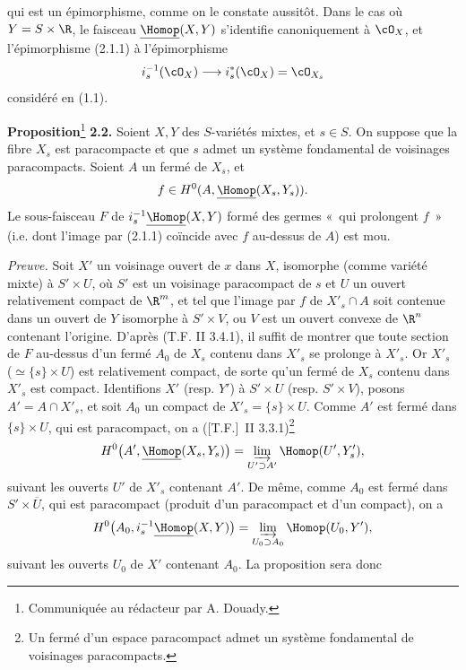 qui est un
épimorphisme, comme on le constate aussitôt. Dans le cas où $Y=S\times\R$, le faisceau $\underline{\Homop}(X,Y)$ s'identifie canoniquement à $\cO_X$, et l'épimorphisme (2.1.1) à l'épimorphisme
\[
  i_s^{-1}(\cO_X)\longrightarrow i_s^*(\cO_X)=\cO_{X_s}
\]
considéré en (1.1).

\textbf{Proposition}\footnote{Communiquée au rédacteur par A. Douady.} \textbf{2.2.} Soient $X,Y$ des $S$-variétés mixtes, et $s\in S$. On suppose que la fibre $X_s$ est paracompacte et que $s$ admet un système fondamental de voisinages paracompacts. Soient $A$ un fermé de $X_s$, et
\[
  f\in H^0(A,\underline{\Homop}(X_s,Y_s)).
\]
Le sous-faisceau $F$ de $i_s^{-1}\underline{\Homop}(X,Y)$ formé des germes «~qui prolongent $f$~» (i.e. dont l'image par (2.1.1) coïncide avec $f$ au-dessus de $A$) est mou.

\emph{Preuve.} Soit $X'$ un voisinage ouvert de $x$ dans $X$, isomorphe (comme variété mixte) à $S'\times U$, où $S'$ est un voisinage paracompact de $s$ et $U$ un ouvert relativement compact de $\R^m$, et tel que l'image par $f$ de $X'_s\cap A$ soit contenue dans un ouvert de $Y$ isomorphe à $S'\times V$, ou $V$ est un ouvert convexe de $\R^n$ contenant l'origine. D'après (T.F. II 3.4.1), il suffit de montrer que toute section de $F$ au-dessus d'un fermé $A_0$ de $X_s$ contenu dans $X'_s$ se prolonge à $X'_s$. Or $X'_s$ ($\simeq\{s\}\times U$) est relativement compact, de sorte qu'un fermé de $X_s$ contenu dans $X'_s$ est compact. Identifions $X'$ (resp. $Y'$) à $S'\times U$ (resp. $S'\times V$), posons $A'=A\cap X'_s$, et soit $A_0$ un compact de $X'_s=\{s\}\times U$. Comme $A'$ est fermé dans $\{s\}\times U$, qui est paracompact, on a ([T.F.]~II 3.3.1)\footnote{Un fermé d'un espace paracompact admet un système fondamental de voisinages paracompacts.}
\[
  H^0\bigl(A',\underline{\Homop}(X_s,Y_s)\bigr)
  =\varinjlim_{U'\supset A'}\Homop(U',Y'_s),
\]
suivant les ouverts $U'$ de $X'_s$ contenant $A'$. De même, comme $A_0$ est fermé dans $S'\times \overline U$, qui est paracompact (produit d'un paracompact et d'un compact), on a
\[
  H^0\bigl(A_0,i_s^{-1}\underline{\Homop}(X,Y)\bigr)
  =\varinjlim_{U_0\supset A_0}\Homop(U_0,Y'),
\]
suivant les ouverts $U_0$ de $X'$ contenant $A_0$. La proposition sera donc
